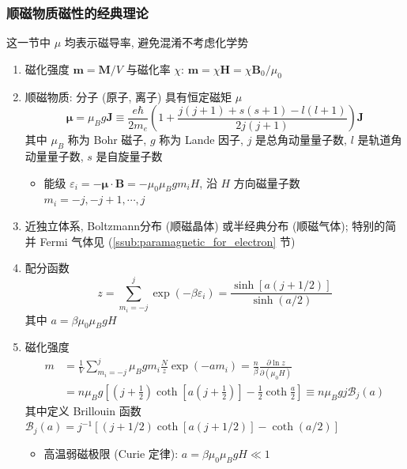 \documentclass[12pt,a4paper]{article}%
\numberwithin{equation}{section}
\renewcommand*{\vec}[1]{\bm{#1}}%
\begin{document}
\subsubsection{顺磁物质磁性的经典理论} %
\label{ssub:paramagnetic_classical}
这一节中 $\mu$ 均表示磁导率, 避免混淆不考虑化学势
\begin{enumerate}
    \item 磁化强度 $\vec m = \vec M/V$ 与磁化率 $\chi$: $\vec m = \chi \vec H = \chi \vec B_0/\mu_0$
    \item 顺磁物质: 分子 (原子, 离子) 具有恒定磁矩 $\mu$
    \begin{equation}
        \vec\mu = \mu_B g\vec J \equiv \frac{e\hbar}{2m_e}\left(1+\frac{j(j+1)+s(s+1)-l(l+1)}{2j(j+1)}\right)\vec J
    \end{equation}
    其中 $\mu_B$ 称为 Bohr 磁子, $g$ 称为 Lande 因子, 
    $j$ 是总角动量量子数, $l$ 是轨道角动量量子数, $s$ 是自旋量子数
    \begin{itemize}
        \item 能级 $\varepsilon_i = -\vec \mu\cdot\vec B = -\mu_0\mu_B g m_i H$, 沿 $H$ 方向磁量子数 $m_i = -j, -j+1, \cdots, j$
    \end{itemize}
    \item 近独立体系, Boltzmann分布 (顺磁晶体) 或半经典分布 (顺磁气体); 特别的简并 Fermi 气体见 (\ref{ssub:paramagnetic_for_electron} 节)
    \item 配分函数
    \begin{equation}
        z = \sum_{m_i = -j}^j\exp(-\beta\varepsilon_i) = \frac{\sinh\left[a\left(j+1/2\right)\right]}{\sinh\left(a/2\right)}
    \end{equation}
    其中 $a = \beta\mu_0\mu_BgH$
    \item 磁化强度
    \begin{align}
        m &= \frac1V\sum_{m_i = -j}^j\mu_Bgm_i\frac Nz\exp(-am_i) 
        = \frac n\beta \frac{\partial\ln z}{\partial(\mu_0 H)} \\
        &= n\mu_Bg\left[\left(j+\frac 12\right)\coth\left[a\left(j+\frac 12\right)\right] - \frac 12\coth\frac a2\right] 
        \equiv n\mu_B gj\mathcal B_j(a)
    \end{align}
    其中定义 Brillouin 函数 $\mathcal B_j(a) = j^{-1}\left[\left(j+1/2\right)\coth\left[a\left(j+1/2\right)\right] - \coth(a/2)\right] $
    \begin{itemize}
        \item 高温弱磁极限 (Curie 定律): $a = \beta\mu_0\mu_BgH\ll 1$
        \begin{equation}\label{equ:curie}

\end{equation}
\end{itemize}
\end{enumerate}
\end{document}
